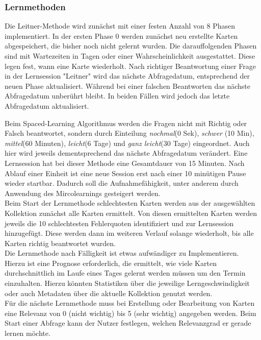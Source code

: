 \subsubsection{Lernmethoden}
Die Leitner-Methode wird zunächst mit einer festen Anzahl von 8 Phasen implementiert. In der ersten Phase 0 werden zunächst neu erstellte Karten abgespeichert, die bisher noch nicht gelernt wurden. Die darauffolgenden Phasen sind mit Wartezeiten in Tagen oder einer Wahrscheinlichkeit ausgestattet. Diese legen fest, wann eine Karte wiederholt. Nach richtiger Beantwortung einer Frage in der Lernsession "Leitner" wird das nächste Abfragedatum, entsprechend der neuen Phase aktualisiert. Während bei einer falschen Beantworten das nächste Abfragedatum unberührt bleibt. In beiden Fällen wird jedoch das letzte Abfragedatum aktualisiert.

Beim Spaced-Learning Algorithmus werden die Fragen nicht mit Richtig oder Falsch beantwortet, sondern durch Einteilung \emph{nochmal}(0 Sek), \emph{schwer} (10 Min), \emph{mittel}(60 Minuten), \emph{leicht}(6 Tage) und \emph{ganz leicht}(30 Tage) eingeordnet. Auch hier wird jeweils dementsprechend das nächste Abfragedatum verändert. 
Eine Lernsession hat bei dieser Methode eine Gesamtdauer von 15 Minuten. Nach Ablauf einer Einheit ist eine neue Session erst nach einer 10 minütigen Pause wieder startbar. Dadurch soll die Aufnahmefähigkeit, unter anderem durch Anwendung des Mircolearnings gesteigert werden. \\

Beim Start der Lernmethode \glqq{}schlechtesten Karten\grqq{} werden aus der ausgewählten Kollektion zunächst alle Karten ermittelt. Von diesen ermittelten Karten werden jeweils die 10 schlechtesten Fehlerquoten identifiziert und zur Lernsession hinzugefügt. Diese werden dann im weiteren Verlauf solange wiederholt, bis alle Karten richtig beantwortet wurden. \\

Die Lernmethode \glqq{}nach Fälligkeit\grqq{} ist etwas aufwändiger zu Implementieren. Hierzu ist eine Prognose erforderlich, die ermittelt, wie viele Karten durchschnittlich im Laufe eines Tages gelernt werden müssen um den Termin einzuhalten. Hierzu könnten Statistiken über die jeweilige Lerngeschwindigkeit oder auch Metadaten über die aktuelle Kollektion genutzt werden. \\

Für die nächste Lernmethode muss bei Erstellung oder Bearbeitung von Karten eine Relevanz von 0 (nicht wichtig) bis 5 (sehr wichtig) angegeben werden. Beim Start einer Abfrage kann der Nutzer festlegen, welchen Relevanzgrad er gerade lernen möchte. \\

